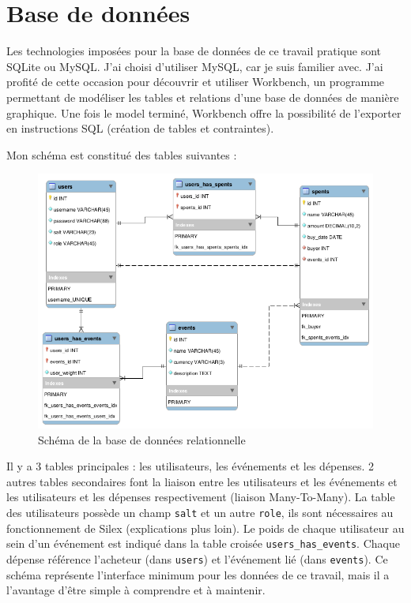 \documentclass[a4paper, 12pt]{article}
\begin{document}
\section{Base de données}
Les technologies imposées pour la base de données de ce travail pratique sont SQLite ou MySQL. J'ai choisi d'utiliser 
MySQL, car je suis familier avec. J'ai profité de cette occasion pour découvrir et utiliser Workbench, un programme 
permettant de modéliser les tables et relations d'une base de données de manière graphique. Une fois le model terminé, 
Workbench offre la possibilité de l'exporter en instructions SQL (création de tables et contraintes).
\bigbreak

Mon schéma est constitué des tables suivantes :
\begin{figure}
	\begin{center}
		\includegraphics[width=1.0\textwidth]{database.png}
	\end{center}
	\caption{Schéma de la base de données relationnelle}
\end{figure}
Il y a 3 tables principales : les utilisateurs, les événements et les dépenses. 2 autres tables secondaires 
font la liaison entre les utilisateurs et les événements et les utilisateurs et les dépenses respectivement 
(liaison Many-To-Many). La table des utilisateurs possède un champ \texttt{salt} et un autre 
\texttt{role}, ils sont nécessaires au fonctionnement de Silex (explications plus loin). Le poids 
de chaque utilisateur au sein d'un événement est indiqué dans la table croisée 
\texttt{users_has_events}. 
Chaque dépense référence l'acheteur (dans \texttt{users}) et l'événement lié (dans \texttt
{events}). Ce schéma représente l'interface minimum pour les données de ce travail, mais il a l'avantage 
d'être simple à comprendre et à maintenir.
\end{document}
